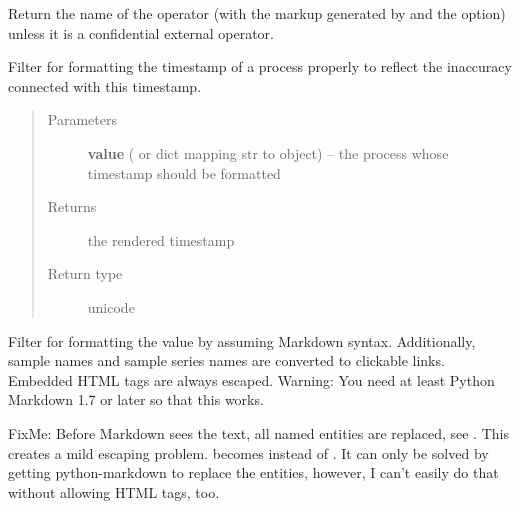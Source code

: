 \documentclass[a4paper,11pt,english]{sphinxmanual}
\begin{document}

\begin{fulllineitems}
\label{programming/template_tags_and_filters:samples.templatetags.samples_extras.get_safe_operator_name}
Return the name of the operator (with the markup generated by
 and the  option) unless it is a
confidential external operator.

\end{fulllineitems}


\begin{fulllineitems}
\label{programming/template_tags_and_filters:samples.templatetags.samples_extras.timestamp}
Filter for formatting the timestamp of a process properly to reflect
the inaccuracy connected with this timestamp.
\begin{quote}\begin{description}
\item[{Parameters}] \leavevmode
\textbf{value} ( or dict mapping str to object) -- the process whose timestamp should be formatted

\item[{Returns}] \leavevmode
the rendered timestamp

\item[{Return type}] \leavevmode
unicode

\end{description}\end{quote}

\end{fulllineitems}


\begin{fulllineitems}
\label{programming/template_tags_and_filters:samples.templatetags.samples_extras.markdown_samples}
Filter for formatting the value by assuming Markdown syntax.
Additionally, sample names and sample series names are converted to
clickable links.  Embedded HTML tags are always escaped.  Warning: You need
at least Python Markdown 1.7 or later so that this works.

FixMe: Before Markdown sees the text, all named entities are replaced, see
.  This creates a mild
escaping problem.   becomes  instead of .
It can only be solved by getting python-markdown to replace the entities,
however, I can't easily do that without allowing HTML tags, too.

\end{fulllineitems}
\end{document}
